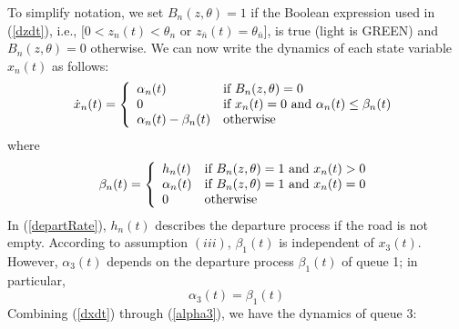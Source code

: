 \documentclass{ifacconf}\usepackage{graphicx}
\begin{document}
To simplify notation, we set $B_{n}(z,\theta)=1$ if the Boolean expression
used in (\ref{dzdt}), i.e., $[0<z_{n}(t)<\theta_{n}$ or $z_{\bar{n}}(t)=\theta_{\bar{n}}]$, is true (light is GREEN) and $B_{n}(z,\theta)=0$
otherwise. We can now write the dynamics of each state variable $x_{n}(t)$ as
follows:\begin{equation}
\dot{x}_{n}(t)=\left\{
\begin{array}
[c]{ll}\alpha_{n}(t) & \text{if }B_{n}(z,\theta)=0\\
0 & \text{if }x_{n}(t)=0\text{ and }\alpha_{n}(t)\leq\beta_{n}(t)\\
\alpha_{n}(t)-\beta_{n}(t) & \text{otherwise}\end{array}
\right.  \label{dxdt}\end{equation}
where
\begin{equation}
\beta_{n}(t)=\left\{
\begin{array}
[c]{ll}h_{n}(t) & \text{if }B_{n}(z,\theta)=1\text{ and }x_{n}(t)>0\\
\alpha_{n}(t) & \text{if }B_{n}(z,\theta)=1\text{ and }x_{n}(t)=0\\
0 & \text{otherwise}\end{array}
\right.  \label{departRate}\end{equation}
In (\ref{departRate}), $h_{n}(t)$ describes the departure process if the road
is not empty. According to assumption $(iii)$, $\beta_{1}(t)$ is independent
of $x_{3}(t)$. However,  $\alpha_{3}(t)$ depends on the departure process
$\beta_{1}(t)$ of queue 1; in particular,
\begin{equation}
\alpha_{3}(t)=\beta_{1}(t)\label{alpha3}\end{equation}
Combining (\ref{dxdt}) through (\ref{alpha3}), we have the dynamics of queue
3:
\end{document}
